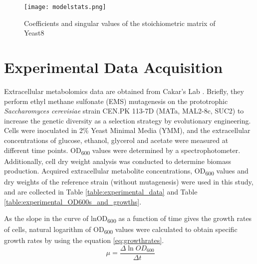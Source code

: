 \begin{figure}[H]
\begin{center}
\texttt{[image: modelstats.png]}
\end{center}
\caption[Coefficients and singular values of the stoichiometric matrix of Yeast8]{Coefficients and singular values of the stoichiometric matrix of Yeast8}
\label{fig:modelstats}
\end{figure}



\section{Experimental Data Acquisition} \label{experimentaldataacquisition}
Extracellular metabolomics data are obtained from Cakar's Lab \cite{arslan2018physiological}. Briefly, they perform ethyl methane sulfonate (EMS) mutagenesis  on the prototrophic \emph{Saccharomyces cerevisiae} strain CEN.PK 113-7D (MATa, MAL2-8c, SUC2) to increase the genetic diversity as a selection strategy by evolutionary engineering. Cells were inoculated in 2\% Yeast Minimal Media (YMM), and the extracellular concentrations of glucose, ethanol, glycerol and acetate were measured at different time points. OD\textsubscript{600} values were determined by a spectrophotometer. Additionally, cell dry weight analysis was conducted to determine biomass production. Acquired extracellular metabolite concentrations, OD\textsubscript{600} values and dry weights of the reference strain (without mutagenesis) were used in this study, and are collected in Table \ref{table:experimental_data} and Table \ref{table:experimental_OD600s_and_growths}.




As the slope in the curve of lnOD\textsubscript{600} as a function of time gives the growth rates of cells, natural logarithm of OD\textsubscript{600} values were calculated to obtain specific growth rates by using the equation \ref{eq:growthrates}.
  \begin{equation}
      \ \mu = \frac{\Delta \ln{OD_{600}}}{\Delta t}
      \label{eq:growthrates}
  \end{equation}

